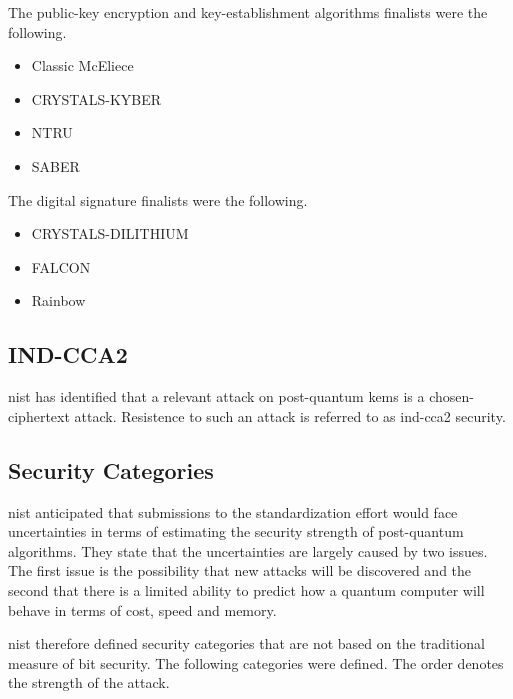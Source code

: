 The public-key encryption and key-establishment algorithms finalists were the following.

\begin{itemize}
    \item Classic McEliece
    \item CRYSTALS-KYBER
    \item NTRU
    \item SABER
\end{itemize}

The digital signature finalists were the following.

\begin{itemize}
    \item CRYSTALS-DILITHIUM
    \item FALCON
    \item Rainbow
\end{itemize}

\subsection{IND-CCA2}

\gls{nist} has identified that a relevant attack on post-quantum \glspl{kem} is a chosen-ciphertext attack. Resistence to such an attack is referred to as \gls{ind-cca2} security\cite{nist2017}. 


\subsection{Security Categories}

\gls{nist} anticipated that submissions to the standardization effort would face uncertainties in terms of estimating the security strength of post-quantum algorithms. They state that the uncertainties are largely caused by two issues. The first issue is the possibility that new attacks will be discovered and the second that there is a limited ability to predict how a quantum computer will behave in terms of cost, speed and memory\cite{nist2017}.

\gls{nist} therefore defined security categories that are not based on the traditional measure of bit security. The following categories were defined. The order denotes the strength of the attack\cite{nist2017}.

